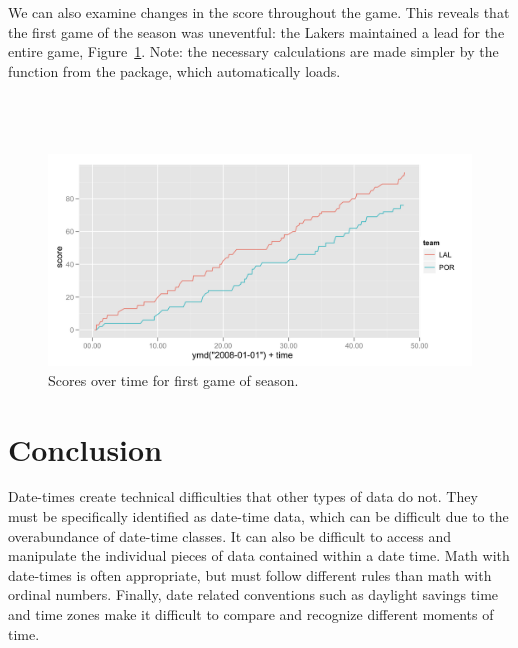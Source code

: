 \documentclass[article]{jss}
\begin{document}
We can also examine changes in the score throughout the game. This reveals that the first game of the season was uneventful: the Lakers maintained a lead for the entire game, Figure~\ref{fig:scores}. Note: the necessary calculations are made simpler by the  function from the  package, which  automatically loads. \\

\\
\\
\\

\begin{figure}[htpb]
  \centering
  \includegraphics[width=\textwidth]{score-comparison.png}        
  \caption{Scores over time for first game of season.}
  \label{fig:scores}
\end{figure}


\section{Conclusion}
Date-times create technical difficulties that other types of data do not. They must be specifically identified as date-time data, which can be difficult due to the overabundance of date-time classes. It can also be difficult to access and manipulate the individual pieces of data contained within a date time. Math with date-times is often appropriate, but must follow different rules than math with ordinal numbers. Finally, date related conventions such as daylight savings time and time zones make it difficult to compare and recognize different moments of time.
\end{document}
